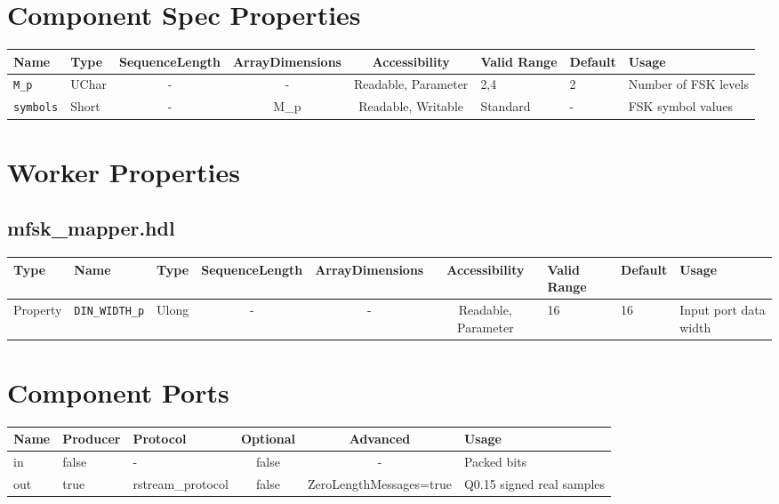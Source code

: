 \documentclass{article}
\def\comp{mfsk\_mapper}
\begin{document}
\begin{landscape}
	\section*{Component Spec Properties}
	\begin{scriptsize}
		\begin{tabular}{|p{2cm}|p{1.5cm}|c|c|c|p{1.5cm}|p{1cm}|p{7cm}|}
			\hline
			\rowcolor{blue}
			Name          	& Type  & SequenceLength & ArrayDimensions & Accessibility       & Valid Range 	& Default & Usage              	\\
			\hline
			\verb+M_p+    	& UChar & -              & -               & Readable, Parameter & 2,4       	& 2       & Number of FSK levels \\
			\hline
			\verb+symbols+  & Short & -              & M\_p            & Readable, Writable	 & Standard    	& -       & FSK symbol values 	\\
			\hline
		\end{tabular}
	\end{scriptsize}

	\section*{Worker Properties}
	\subsection*{\comp.hdl}
	\begin{scriptsize}
		\begin{tabular}{|p{2cm}|p{2cm}|p{1cm}|c|c|c|p{2cm}|p{1cm}|p{4cm}|}
			\hline
			\rowcolor{blue}
			Type     & Name                 & Type  & SequenceLength & ArrayDimensions & Accessibility       & Valid Range 	& Default 	& Usage               	\\
			\hline
			Property & \verb+DIN_WIDTH_p+ 	& Ulong & -              & -               & Readable, Parameter & 16       	& 16     	& Input port data width	\\
			\hline
		\end{tabular}
	\end{scriptsize}

	\section*{Component Ports}
	\begin{scriptsize}
		\begin{tabular}{|M{2cm}|M{1.5cm}|M{4cm}|c|c|p{9cm}|}
			\hline
			\rowcolor{blue}
			Name & Producer & Protocol			& Optional & Advanced 					& Usage      			\\
			\hline
			in   & false    & -					& false    & -        					& Packed bits         	\\
			\hline
			out  & true     & rstream\_protocol & false    & ZeroLengthMessages=true    & Q0.15 signed real samples	\\
			\hline
		\end{tabular}
	\end{scriptsize}

\end{landscape}
\end{document}
